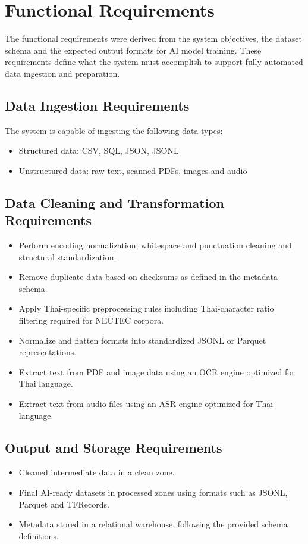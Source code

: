\documentclass[12pt,oneside,openright,a4paper]{cpe-english-project}
\begin{document}
\section{Functional Requirements}

The functional requirements were derived from the system objectives, the dataset schema and the expected output formats for AI model training. These requirements define what the system must accomplish to support fully automated data ingestion and preparation.

\subsection{Data Ingestion Requirements}
The system is capable of ingesting the following data types:
\begin{itemize}
\item Structured data: CSV, SQL, JSON, JSONL
\item Unstructured data: raw text, scanned PDFs, images and audio
\end{itemize}

\subsection{Data Cleaning and Transformation Requirements}
\begin{itemize}
\item Perform encoding normalization, whitespace and punctuation cleaning and structural standardization.
\item Remove duplicate data based on checksums as defined in the metadata schema.
\item Apply Thai-specific preprocessing rules including Thai-character ratio filtering required for NECTEC corpora.
\item Normalize and flatten formats into standardized JSONL or Parquet representations.
\item Extract text from PDF and image data using an OCR engine optimized for Thai language.
\item Extract text from audio files using an ASR engine optimized for Thai language.
\end{itemize}

\subsection{Output and Storage Requirements}
\begin{itemize}
\item Cleaned intermediate data in a clean zone.
\item Final AI-ready datasets in processed zones using formats such as JSONL, Parquet and TFRecords.
\item Metadata stored in a relational warehouse, following the provided schema definitions.
\end{itemize}
\end{document}
